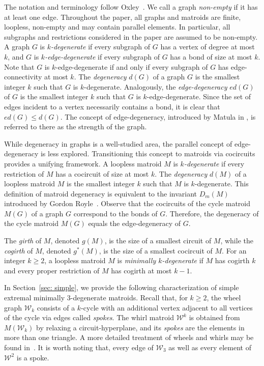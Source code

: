 \documentclass{amsart}
\theoremstyle{definition}
\theoremstyle{remark}
\numberwithin{equation}{section}
\begin{document}
The notation and terminology follow Oxley~\cite{Oxl11}. We call a graph \textit{non-empty} if it has at least one edge. Throughout the paper, all graphs and matroids are finite, loopless, non-empty and may contain parallel elements. In particular, all subgraphs and restrictions considered in the paper are assumed to be non-empty. A graph $G$ is \textit{$k$-degenerate} if every subgraph of $G$ has a vertex of degree at most $k$, and $G$ is \textit{$k$-edge-degenerate} if every subgraph of $G$ has a bond of size at most $k$. Note that $G$ is $k$-edge-degenerate if and only if every subgraph of $G$ has edge-connectivity at most $k$. The \textit{degeneracy} $d(G)$ of a graph $G$ is the smallest integer $k$ such that $G$ is $k$-degenerate. Analogously, the \textit{edge-degeneracy} $ed(G)$ of $G$ is the smallest integer $k$ such that $G$ is $k$-edge-degenerate. Since the set of edges incident to a vertex necessarily contains a bond, it is clear that $ed(G) \leq d(G)$. The concept of edge-degeneracy, introduced by Matula in \cite{matula_72}, is referred to there as the strength of the graph.

While degeneracy in graphs is a well-studied area, the parallel concept of edge-degeneracy is less explored. Transitioning this concept to matroids via cocircuits provides a unifying framework. A loopless matroid $M$ is \textit{$k$-degenerate} if every restriction of $M$ has a cocircuit of size at most $k$. The \textit{degeneracy} $d(M)$ of a loopless matroid $M$ is the smallest integer $k$ such that $M$ is $k$-degenerate. This definition of matroid degeneracy is equivalent to the invariant $D_m(M)$ introduced by Gordon Royle~\cite{royle_2015}. Observe that the cocircuits of the cycle matroid $M(G)$ of a graph $G$ correspond to the bonds of $G$. Therefore, the degeneracy of the cycle matroid $M(G)$ equals the edge-degeneracy of $G$.

The \textit{girth} of $M$, denoted $g(M)$, is the size of a smallest circuit of $M$, while the \textit{cogirth} of $M$, denoted $g^*(M)$, is the size of a smallest cocircuit of $M$. For an integer $k\geq 2$, a loopless matroid $M$ is \textit{minimally $k$-degenerate} if $M$ has cogirth $k$ and every proper restriction of $M$ has cogirth at most $k-1$. 

In Section~\ref{sec: simple}, we provide the following characterization of simple extremal minimally $3$-degenerate matroids. Recall that, for $k\geq 2$, the wheel graph $\mathcal{W}_k$ consists of a $k$-cycle with an additional vertex adjacent to all vertices of the cycle via edges called \textit{spokes}. The whirl matroid $\mathcal{W}^k$ is obtained from $M(\mathcal{W}_k)$ by relaxing a circuit-hyperplane, and its \textit{spokes} are the elements in more than one triangle. A more detailed treatment of wheels and whirls may be found in~\cite[Section~8.4]{Oxl11}. It is worth noting that, every edge of $\mathcal{W}_3$ as well as every element of $\mathcal{W}^2$ is a spoke.
\end{document}
